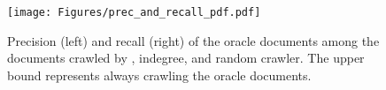 
\begin{figure}[t]
    \centering
    \texttt{[image: Figures/prec\_and\_recall\_pdf.pdf]}
    \caption{Precision (left) and recall (right) of the oracle documents among the documents crawled by \ours{}, indegree, and random crawler. The upper bound represents always crawling the oracle documents.}
    \label{fig:overlap}
\end{figure}